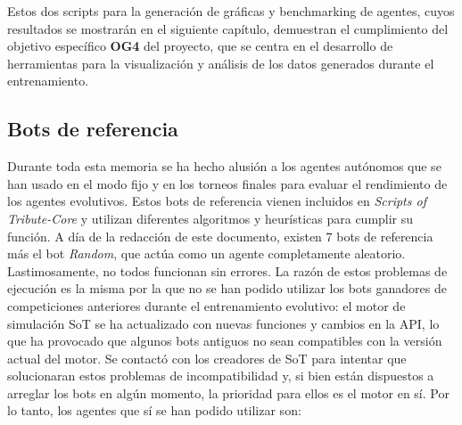Estos dos scripts para la generación de gráficas y benchmarking de agentes, cuyos resultados se mostrarán en el siguiente capítulo, demuestran el cumplimiento del objetivo específico \textbf{OG4} del proyecto, que se centra en el desarrollo de herramientas para la visualización y análisis de los datos generados durante el entrenamiento.

\subsection{Bots de referencia} \label{sec:bots_referencia}

Durante toda esta memoria se ha hecho alusión a los agentes autónomos que se han usado en el modo fijo y en los torneos finales para evaluar el rendimiento de los agentes evolutivos. Estos bots de referencia vienen incluidos en \textit{Scripts of Tribute-Core} y utilizan diferentes algoritmos y heurísticas para cumplir su función. A día de la redacción de este documento, existen 7 bots de referencia más el bot \textit{Random}, que actúa como un agente completamente aleatorio. Lastimosamente, no todos funcionan sin errores. La razón de estos problemas de ejecución es la misma por la que no se han podido utilizar los bots ganadores de competiciones anteriores durante el entrenamiento evolutivo: el motor de simulación SoT se ha actualizado con nuevas funciones y cambios en la API, lo que ha provocado que algunos bots antiguos no sean compatibles con la versión actual del motor. Se contactó con los creadores de SoT para intentar que solucionaran estos problemas de incompatibilidad y, si bien están dispuestos a arreglar los bots en algún momento, la prioridad para ellos es el motor en sí. Por lo tanto, los agentes que sí se han podido utilizar son:

